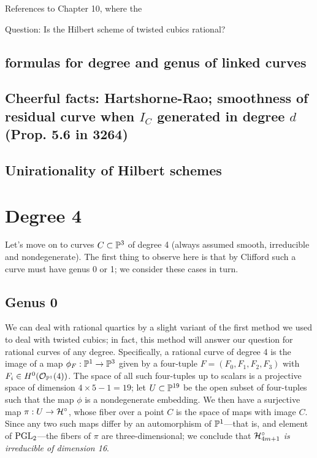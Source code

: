 References to Chapter 10, where the 

Question: Is the Hilbert scheme of twisted cubics rational?

\subsection{formulas for degree and genus of linked curves}

\subsection{Cheerful facts: Hartshorne-Rao; smoothness of residual curve when $I_C$ generated in degree $d$ (Prop. 5.6 in 3264)}

\subsection{Unirationality of Hilbert schemes}

\section{Degree 4}

Let's move on to curves $C \subset {\mathbb P}^3$ of degree 4 (always assumed smooth, irreducible and nondegenerate). The first thing to observe here is that by Clifford such a curve must have genus 0 or 1; we consider these cases in turn.

\subsection{Genus 0}\label{degree 4 genus 0}

We can deal with rational quartics by a slight variant of the first method we used to deal with twisted cubics; in fact, this method will answer our question for rational curves of any degree. Specifically, a rational curve of degree 4 is the image of a map $\phi_F : {\mathbb P}^1 \to {\mathbb P}^3$ given by a four-tuple $F = (F_0,F_1,F_2,F_3)$ with $F_i \in H^0({\mathcal O}_{{\mathbb P}^1}(4))$. The space of all such four-tuples up to scalars is a projective space of dimension $4 \times 5 - 1 = 19$; let $U \subset {\mathbb P}^{19}$ be the open subset of four-tuples such that the map $\phi$ is a nondegenerate embedding. We then have a surjective map $\pi : U \to {\cal H}^\circ$, whose fiber over a point $C$ is the space of maps with image $C$. Since any two such maps differ by an automorphism of ${\mathbb P}^1$---that is, and element of $\operatorname{PGL}_2$---the fibers of $\pi$ are three-dimensional; we conclude that \emph{${\cal H}^\circ_{4m+1}$ is irreducible of dimension 16}.

